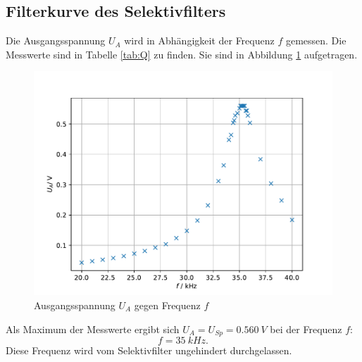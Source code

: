 \subsection{Filterkurve des Selektivfilters}
Die Ausgangsspannung $U_A$ wird in Abhängigkeit der Frequenz $f$ gemessen.
Die Messwerte sind in Tabelle \ref{tab:Q} zu finden.
Sie sind in Abbildung \ref{fig:Q} aufgetragen.

\begin{figure}[h!]
  \centering
  \includegraphics[width=\textwidth]{Q.pdf}
  \caption{Ausgangsspannung $U_A$ gegen Frequenz $f$}
  \label{fig:Q}
\end{figure}
Als Maximum der Messwerte ergibt sich $U_A=U_{Sp}=\SI{0.560}{V}$ bei der Frequenz $f$:
\begin{equation*}
  f=\SI{35}{kHz}.
\end{equation*}
Diese Frequenz wird vom Selektivfilter ungehindert durchgelassen.

\FloatBarrier
